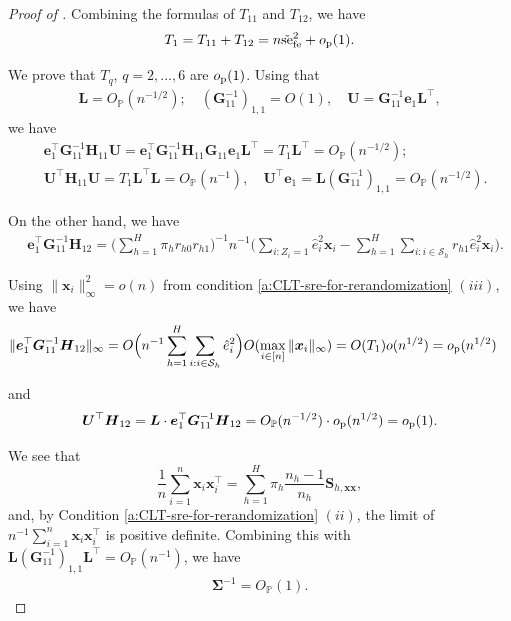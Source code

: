 \documentclass[12pt]{article}
\newcommand{\se}{\textnormal{se}}
\newcommand{\op}{o_{\textnormal{p}}}
\newcommand{\Op}{O_{\mathbb{P}}}
\newcommand{\ms}{\mathcal{S}}
\newcommand{\fe}{\textnormal{fe}}
\newcommand{\bs}{\boldsymbol}
\begin{document}
\begin{proof}[Proof of ]
Combining the formulas of $T_{11}$ and $T_{12}$, we have
\begin{align*}
    T_1 = T_{11} + T_{12} = n\tilde{\se}_{\fe }^2 + \op(1).
\end{align*}

We prove that $T_q$, $q=2,\ldots,6$ are $\op(1)$. Using that
\begin{align*}
    \bs{L} = \Op(n^{-1/2});\quad (\bs{G}_{11}^{-1})_{1,1}= O(1),\quad \bs{U}= \bs{G}_{11}^{-1} \bs{e}_{1} \bs{L}^\top,
\end{align*}
we have
\begin{align}
    &\bs{e}_1^\top  \bs{G}_{11}^{-1} \bs{H}_{11}  \bs{U} = \bs{e}_1^\top  \bs{G}_{11}^{-1} \bs{H}_{11} \bs{G}_{11} \bs{e}_1 \bs{L}^\top = T_1 \bs{L}^\top = \Op(n^{-1/2});
    \label{eq:quantity-order-1}\\
    &\bs{U}^\top \bs{H}_{11}\bs{U} = T_1 \bs{L}^\top \bs{L} = \Op(n^{-1}), \quad \bs{U}^\top \bs{e}_1 = \bs{L} (\bs{G}_{11}^{-1})_{1,1} =  \Op(n^{-1/2}). \label{eq:quantity-order-2}
\end{align} 

On the other hand, we have
\begin{align*}
    &\bs{e}_1^\top  \bs{G}_{11}^{-1} \bs{H}_{12} = \Big(\sum_{h=1}^H \pi_{h} r_{h0} r_{h1}\Big)^{-1} n^{-1}\Big( \sum_{i:Z_i=1} \hat{e}_i^2 \bs{x}_i-\sum_{h=1}^H \sum_{i:i\in\ms_{h}} r_{h1} \hat{e}_i^2 \bs{x}_i\Big).
\end{align*}

  Using $\|\bs{x}_i\|_{\infty}^2 = o(n)$ 
from condition \ref{a:CLT-sre-for-rerandomization} $(iii)$, we have
\begin{align}
    \|\bs{e}_1^\top  \bs{G}_{11}^{-1} \bs{H}_{12}\|_{\infty} &= O\Big(n^{-1}\sum_{h=1}^H \sum_{i:i\in\ms_{h}} \hat{e}_i^2 \Big) O(\max_{i\in [n]}\|\bs{x}_i\|_{\infty}) = O(T_1)o(n^{1/2}) = \op(n^{1/2}) \label{eq:quantity-order-3}
\end{align}

and 
\begin{align}
\label{eq:quantity-order-4}
     \bs{U}^\top \bs{H}_{12} = \bs{L} \cdot \bs{e}_1^\top \bs{G}_{11}^{-1} \bs{H}_{12} = \Op(n^{-1/2})\cdot\op(n^{1/2}) = \op(1).
\end{align}

We see that 
\[
\frac{1}{n} \sum_{i=1}^n \bs{x}_i \bs{x}_i^\top = \sum_{h=1}^H \pi_h \frac{n_h-1}{n_h} \bs{S}_{h,\bs{x}\bs{x}}, 
\]
and, by Condition \ref{a:CLT-sre-for-rerandomization} $(ii)$, the limit of $n^{-1}\sum_{i=1}^n \bs{x}_i \bs{x}_i^\top$ is positive definite. Combining this with $\bs{L}(\bs{G}_{11}^{-1})_{1,1}\bs{L}^\top = \Op(n^{-1})$, we have
\begin{align}
    \label{eq:quantity-order-5}
    \bs{\Sigma}^{-1} = \Op(1).
\end{align}


\end{proof}
\end{document}
